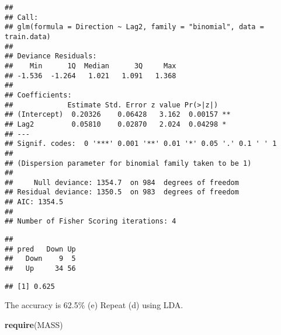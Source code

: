\documentclass[]{article}
\newenvironment{Shaded}{\begin{snugshade}}{\end{snugshade}}
\newcommand{\KeywordTok}[1]{\textcolor[rgb]{0.13,0.29,0.53}{\textbf{{#1}}}}
\newcommand{\DataTypeTok}[1]{\textcolor[rgb]{0.13,0.29,0.53}{{#1}}}
\newcommand{\DecValTok}[1]{\textcolor[rgb]{0.00,0.00,0.81}{{#1}}}
\newcommand{\FloatTok}[1]{\textcolor[rgb]{0.00,0.00,0.81}{{#1}}}
\newcommand{\StringTok}[1]{\textcolor[rgb]{0.31,0.60,0.02}{{#1}}}
\newcommand{\CommentTok}[1]{\textcolor[rgb]{0.56,0.35,0.01}{\textit{{#1}}}}
\newcommand{\NormalTok}[1]{{#1}}
\begin{document}
\begin{verbatim}
## 
## Call:
## glm(formula = Direction ~ Lag2, family = "binomial", data = train.data)
## 
## Deviance Residuals: 
##    Min      1Q  Median      3Q     Max  
## -1.536  -1.264   1.021   1.091   1.368  
## 
## Coefficients:
##             Estimate Std. Error z value Pr(>|z|)   
## (Intercept)  0.20326    0.06428   3.162  0.00157 **
## Lag2         0.05810    0.02870   2.024  0.04298 * 
## ---
## Signif. codes:  0 '***' 0.001 '**' 0.01 '*' 0.05 '.' 0.1 ' ' 1
## 
## (Dispersion parameter for binomial family taken to be 1)
## 
##     Null deviance: 1354.7  on 984  degrees of freedom
## Residual deviance: 1350.5  on 983  degrees of freedom
## AIC: 1354.5
## 
## Number of Fisher Scoring iterations: 4
\end{verbatim}

\begin{Shaded}
\end{Shaded}

\begin{verbatim}
##       
## pred   Down Up
##   Down    9  5
##   Up     34 56
\end{verbatim}

\begin{Shaded}
\end{Shaded}

\begin{verbatim}
## [1] 0.625
\end{verbatim}

The accuracy is 62.5\% (e) Repeat (d) using LDA.

\begin{Shaded}
\begin{Highlighting}[]
\KeywordTok{require}\NormalTok{(MASS)}
\end{Highlighting}
\end{Shaded}
\end{document}
